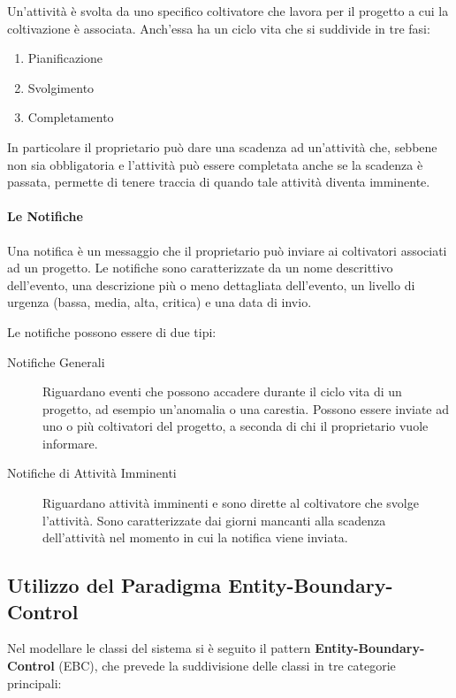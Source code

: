\documentclass[12pt,a4paper]{article}
\begin{document}
Un'attività è svolta da uno specifico coltivatore che lavora per il progetto a cui la
coltivazione è associata. Anch'essa ha un ciclo vita che si suddivide in tre fasi:

\begin{enumerate}
    \item Pianificazione
    \item Svolgimento
    \item Completamento
\end{enumerate}

In particolare il proprietario può dare una scadenza ad un'attività che, sebbene non sia
obbligatoria e l'attività può essere completata anche se la scadenza è passata, permette di
tenere traccia di quando tale attività diventa imminente.

\paragraph{Le Notifiche}

Una notifica è un messaggio che il proprietario può inviare ai coltivatori associati ad un
progetto. Le notifiche sono caratterizzate da un nome descrittivo dell'evento, una
descrizione più o meno dettagliata dell'evento, un livello di urgenza (bassa, media, alta,
critica) e una data di invio.

Le notifiche possono essere di due tipi:

\begin{description}
    \item[Notifiche Generali] Riguardano eventi che possono accadere durante il ciclo vita
        di un progetto, ad esempio un'anomalia o una carestia. Possono essere inviate ad uno
        o più coltivatori del progetto, a seconda di chi il proprietario vuole informare.
    \item[Notifiche di Attività Imminenti] Riguardano attività imminenti e sono dirette al
        coltivatore che svolge l'attività. Sono caratterizzate dai giorni mancanti alla
        scadenza dell'attività nel momento in cui la notifica viene inviata.
\end{description}

\subsection{Utilizzo del Paradigma Entity-Boundary-Control}

Nel modellare le classi del sistema si è seguito il pattern \textbf{Entity-Boundary-Control}
(EBC), che prevede la suddivisione delle classi in tre categorie principali:
\end{document}
